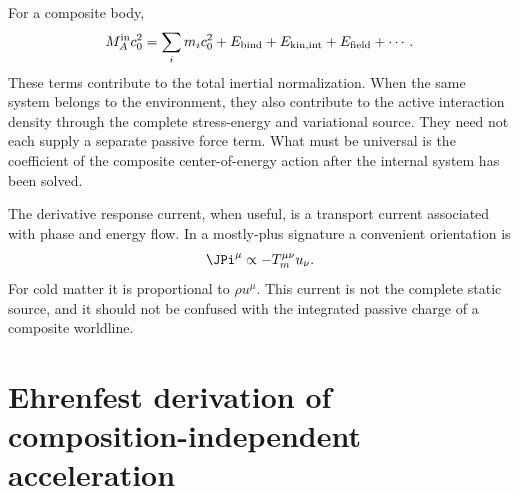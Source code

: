 \documentclass[12pt]{article}
\begin{document}
For a composite body,
\begin{equation}
    M_A^{\rm in}c_0^2
    =\sum_i m_ic_0^2+E_{\rm bind}+E_{\rm kin,int}+E_{\rm field}+\cdots .
    \label{eq:composite-mass-normalized}
\end{equation}
These terms contribute to the total inertial normalization.  When the same system belongs to the environment, they also contribute to the active interaction density through the complete stress-energy and variational source.  They need not each supply a separate passive force term.  What must be universal is the coefficient of the composite center-of-energy action after the internal system has been solved.

The derivative response current, when useful, is a transport current associated with phase and energy flow.  In a mostly-plus signature a convenient orientation is
\begin{equation}
    \JPi^\mu\propto -T_m^{\mu\nu}u_\nu.
    \label{eq:stress-current-normalized}
\end{equation}
For cold matter it is proportional to \(\rho u^\mu\).  This current is not the complete static source, and it should not be confused with the integrated passive charge of a composite worldline.
\section{Ehrenfest derivation of composition-independent acceleration}
\end{document}
